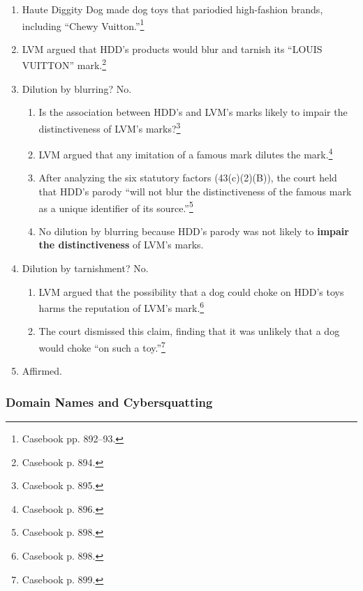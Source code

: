 \begin{enumerate}
    \item Haute Diggity Dog made dog toys that pariodied high-fashion brands, 
    including ``Chewy Vuitton.''\footnote{Casebook pp. 892--93.}
    \item LVM argued that HDD's products would blur and tarnish its ``LOUIS 
    VUITTON'' mark.\footnote{Casebook p. 894.}
    \item Dilution by blurring? No.
    \begin{enumerate}
        \item Is the association between HDD's and LVM's marks likely to 
        impair the distinctiveness of LVM's marks?\footnote{Casebook p. 895.}
        \item LVM argued that any imitation of a famous mark dilutes the 
        mark.\footnote{Casebook p. 896.}
        \item After analyzing the six statutory factors (43(c)(2)(B)), the 
        court held that HDD's parody ``will not blur the distinctiveness of 
        the famous mark as a unique identifier of its 
        source.''\footnote{Casebook p. 898.}
        \item No dilution by blurring because HDD's parody was not likely to 
        \textbf{impair the distinctiveness} of LVM's marks.
    \end{enumerate}
    \item Dilution by tarnishment? No.
    \begin{enumerate}
        \item LVM argued that the possibility that a dog could choke on HDD's 
        toys harms the reputation of LVM's mark.\footnote{Casebook p. 898.}
        \item The court dismissed this claim, finding that it was unlikely 
        that a dog would choke ``on such a toy.''\footnote{Casebook p. 899.}
    \end{enumerate}
    \item Affirmed.
\end{enumerate}

\subsubsection{Domain Names and Cybersquatting}

